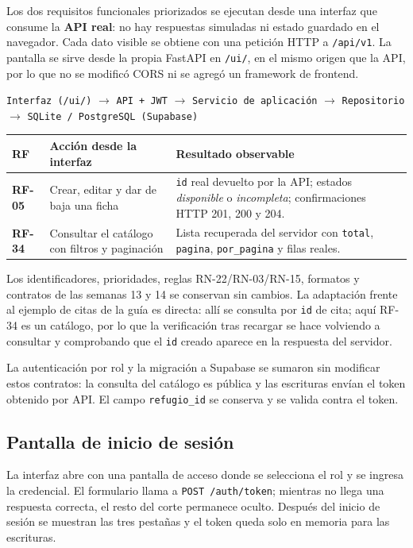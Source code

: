 \documentclass[11pt,a4paper]{article}
\newcommand{\code}[1]{\texttt{#1}}
\newcommand{\thead}[1]{\textbf{#1}}
\begin{document}
Los dos requisitos funcionales priorizados se ejecutan desde una interfaz que
consume la \textbf{API real}: no hay respuestas simuladas ni estado guardado en
el navegador. Cada dato visible se obtiene con una petición HTTP a
\code{/api/v1}. La pantalla se sirve desde la propia FastAPI en \code{/ui/}, en
el mismo origen que la API, por lo que no se modificó CORS ni se agregó un
framework de frontend.

\begin{center}
\code{Interfaz (/ui/)} $\rightarrow$ \code{API + JWT} $\rightarrow$
\code{Servicio de aplicación} $\rightarrow$ \code{Repositorio} $\rightarrow$
\code{SQLite / PostgreSQL (Supabase)}
\end{center}

{\footnotesize
\begin{tabularx}{\linewidth}{@{}V{0.3}V{1.0}V{1.7}@{}}
\toprule
\thead{RF} & \thead{Acción desde la interfaz} & \thead{Resultado observable} \\ \midrule
\textbf{RF-05} & Crear, editar y dar de baja una ficha &
\code{id} real devuelto por la API; estados \emph{disponible} o
\emph{incompleta}; confirmaciones HTTP 201, 200 y 204. \\
\textbf{RF-34} & Consultar el catálogo con filtros y paginación &
Lista recuperada del servidor con \code{total}, \code{pagina},
\code{por\_pagina} y filas reales. \\
\bottomrule
\end{tabularx}
}

Los identificadores, prioridades, reglas RN-22/RN-03/RN-15, formatos y
contratos de las semanas 13 y 14 se conservan sin cambios. La adaptación frente
al ejemplo de citas de la guía es directa: allí se consulta por \code{id} de
cita; aquí RF-34 es un catálogo, por lo que la verificación tras recargar se
hace volviendo a consultar y comprobando que el \code{id} creado aparece en la
respuesta del servidor.

La autenticación por rol y la migración a Supabase se sumaron sin modificar
estos contratos: la consulta del catálogo es pública y las escrituras envían el
token obtenido por API. El campo \code{refugio\_id} se conserva y se valida
contra el token.

\subsection{Pantalla de inicio de sesión}

La interfaz abre con una pantalla de acceso donde se selecciona el rol y se
ingresa la credencial. El formulario llama a \code{POST /auth/token}; mientras
no llega una respuesta correcta, el resto del corte permanece oculto. Después
del inicio de sesión se muestran las tres pestañas y el token queda solo en
memoria para las escrituras.
\end{document}

